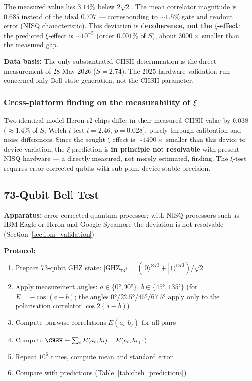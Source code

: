 The measured value lies $3.14\%$ below $2\sqrt{2}$. The mean correlator magnitude is $0.685$ instead of the ideal $0.707$ --- corresponding to $\sim 1.5\%$ gate and readout error (NISQ characteristic). This deviation is \textbf{decoherence, not the $\xi$-effect}: the predicted $\xi$-effect is $\sim 10^{-5}$ (order $0.001\%$ of $S$), about $3000\times$ smaller than the measured gap.

\begin{important}
	\textbf{Data basis:} The only substantiated CHSH determination is the direct measurement of 28 May 2026 ($S = 2.74$). The 2025 hardware validation run concerned only Bell-state generation, not the CHSH parameter.
\end{important}

\subsubsection{Cross-platform finding on the measurability of $\xi$}

Two identical-model Heron r2 chips differ in their measured CHSH value by $0.038$ ($\approx 1.4\%$ of $S$; Welch $t$-test $t=2.46$, $p=0.028$), purely through calibration and noise differences. Since the sought $\xi$-effect is $\sim 1400\times$ smaller than this device-to-device variation, the $\xi$-prediction is \textbf{in principle not resolvable} with present NISQ hardware --- a directly measured, not merely estimated, finding. The $\xi$-test requires error-corrected qubits with sub-ppm, device-stable precision.

\subsection{73-Qubit Bell Test}

\textbf{Apparatus:} error-corrected quantum processor; with NISQ processors such as IBM Eagle or Heron and Google Sycamore the deviation is not resolvable (Section~\ref{sec:ibm_validation})

\textbf{Protocol:}
\begin{enumerate}
	\item Prepare 73-qubit GHZ state: $|\text{GHZ}_{73}\rangle = (|0\rangle^{\otimes 73} + |1\rangle^{\otimes 73})/\sqrt{2}$
	\item Apply measurement angles: $a \in \{0°, 90°\}$, $b \in \{45°, 135°\}$ (for $E = -\cos(a-b)$; the angles $0°/22.5°/45°/67.5°$ apply only to the polarisation correlator $\cos 2(a-b)$)
	\item Compute pairwise correlations $E(a_i, b_j)$ for all pairs
	\item Compute $\CHSH = \sum_i E(a_i, b_i) - E(a_i, b_{i+1})$
	\item Repeat $10^6$ times, compute mean and standard error
	\item Compare with predictions (Table~\ref{tab:chsh_predictions})
\end{enumerate}

